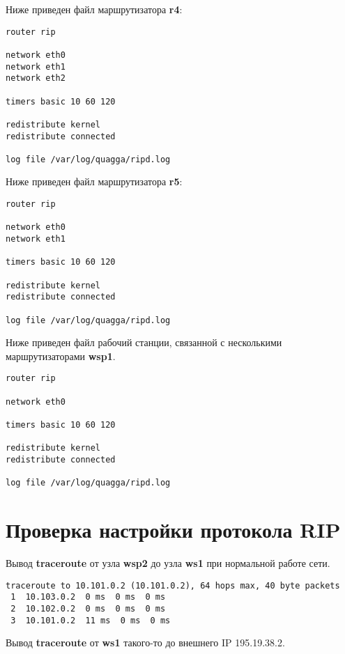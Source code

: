 \documentclass[a4paper,12pt]{article}
\begin{document}
Ниже приведен файл  маршрутизатора \textbf{r4}:

\begin{Verbatim}
router rip

network eth0
network eth1
network eth2

timers basic 10 60 120

redistribute kernel
redistribute connected

log file /var/log/quagga/ripd.log
\end{Verbatim}

Ниже приведен файл  маршрутизатора \textbf{r5}:

\begin{Verbatim}
router rip

network eth0
network eth1

timers basic 10 60 120

redistribute kernel
redistribute connected

log file /var/log/quagga/ripd.log
\end{Verbatim}

Ниже приведен файл  рабочий станции, связанной с несколькими маршрутизаторами \textbf{wsp1}.

\begin{Verbatim}
router rip

network eth0

timers basic 10 60 120

redistribute kernel
redistribute connected

log file /var/log/quagga/ripd.log
\end{Verbatim}


\section{Проверка настройки протокола RIP}

Вывод \textbf{traceroute} от узла \textbf{wsp2} до узла \textbf{ws1} при
нормальной работе сети.

\begin{Verbatim}
traceroute to 10.101.0.2 (10.101.0.2), 64 hops max, 40 byte packets
 1  10.103.0.2  0 ms  0 ms  0 ms
 2  10.102.0.2  0 ms  0 ms  0 ms
 3  10.101.0.2  11 ms  0 ms  0 ms
\end{Verbatim}

Вывод \textbf{traceroute} от \textbf{ws1} такого-то до внешнего IP 195.19.38.2.
\end{document}

